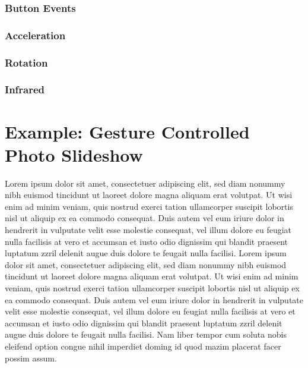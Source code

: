 \documentclass[%
   11pt,              %
   english,           %
   a4paper,           %
   DIV11,             %
   BCOR12mm,		  %
   titlepage,		  %
   bibtotoc,		  %
   liststotoc,		  %
   final,			  %
   twoside,			  %
   openright,		  %
   cleardoubleempty   %
]{scrreprt}%
\begin{document}
\subsection{Button Events}
\subsection{Acceleration}
\subsection{Rotation}
\subsection{Infrared}


\chapter{Example: Gesture Controlled Photo Slideshow}
Lorem ipsum dolor sit amet, consectetuer adipiscing elit, sed diam nonummy nibh euismod tincidunt ut laoreet dolore magna aliquam erat volutpat. Ut wisi enim ad minim veniam, quis nostrud exerci tation ullamcorper suscipit lobortis nisl ut aliquip ex ea commodo consequat. Duis autem vel eum iriure dolor in hendrerit in vulputate velit esse molestie consequat, vel illum dolore eu feugiat nulla facilisis at vero et accumsan et iusto odio dignissim qui blandit praesent luptatum zzril delenit augue duis dolore te feugait nulla facilisi. Lorem ipsum dolor sit amet, consectetuer adipiscing elit, sed diam nonummy nibh euismod tincidunt ut laoreet dolore magna aliquam erat volutpat. Ut wisi enim ad minim veniam, quis nostrud exerci tation ullamcorper suscipit lobortis nisl ut aliquip ex ea commodo consequat. Duis autem vel eum iriure dolor in hendrerit in vulputate velit esse molestie consequat, vel illum dolore eu feugiat nulla facilisis at vero et accumsan et iusto odio dignissim qui blandit praesent luptatum zzril delenit augue duis dolore te feugait nulla facilisi. Nam liber tempor cum soluta nobis eleifend option congue nihil imperdiet doming id quod mazim placerat facer possim assum.


\listoffigures
\listoftables

\end{document}
